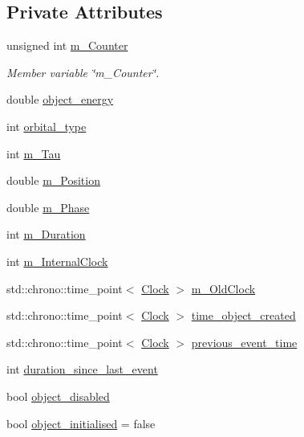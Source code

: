 \subsection*{Private Attributes}
\begin{DoxyCompactItemize}
\item 
unsigned int \mbox{\hyperlink{classOrbital_aa372740124e986fd28903fc0a58b9c76}{m\+\_\+\+Counter}}
\begin{DoxyCompactList}\small\item\em Member variable \char`\"{}m\+\_\+\+Counter\char`\"{}. \end{DoxyCompactList}\item 
double \mbox{\hyperlink{classOrbital_ac625d580da26f03f2222352c92b9e61e}{object\+\_\+energy}}
\item 
int \mbox{\hyperlink{classOrbital_a00b10dd18889b7ab0f3a60de0c6bdcf5}{orbital\+\_\+type}}
\item 
int \mbox{\hyperlink{classOrbital_a39c9d2d348dc7c20970bb16c01c7649e}{m\+\_\+\+Tau}}
\item 
double \mbox{\hyperlink{classOrbital_a16163ba33abccd079bbf5f4bcb9d9054}{m\+\_\+\+Position}}
\item 
double \mbox{\hyperlink{classOrbital_a74299cf4fcffa5078b836c66204439cc}{m\+\_\+\+Phase}}
\item 
int \mbox{\hyperlink{classOrbital_a890367094e4fd52818480127d4cf5083}{m\+\_\+\+Duration}}
\item 
int \mbox{\hyperlink{classOrbital_a8aa88a5fe3fc3bc9c662886ca890360c}{m\+\_\+\+Internal\+Clock}}
\item 
std\+::chrono\+::time\+\_\+point$<$ \mbox{\hyperlink{universe_8h_a0ef8d951d1ca5ab3cfaf7ab4c7a6fd80}{Clock}} $>$ \mbox{\hyperlink{classOrbital_aa3a9163f5de9d49cd8fa11c87502a67b}{m\+\_\+\+Old\+Clock}}
\item 
std\+::chrono\+::time\+\_\+point$<$ \mbox{\hyperlink{universe_8h_a0ef8d951d1ca5ab3cfaf7ab4c7a6fd80}{Clock}} $>$ \mbox{\hyperlink{classOrbital_a0c5c5ea93a03de69e7aa0267d74d8740}{time\+\_\+object\+\_\+created}}
\item 
std\+::chrono\+::time\+\_\+point$<$ \mbox{\hyperlink{universe_8h_a0ef8d951d1ca5ab3cfaf7ab4c7a6fd80}{Clock}} $>$ \mbox{\hyperlink{classOrbital_aa7389103c601bdc29ae97f52d85966a2}{previous\+\_\+event\+\_\+time}}
\item 
int \mbox{\hyperlink{classOrbital_a8deef7437a3b111b12a78e9bc9919604}{duration\+\_\+since\+\_\+last\+\_\+event}}
\item 
bool \mbox{\hyperlink{classOrbital_ae2f3114681ba00fdfeea23d60efea869}{object\+\_\+disabled}}
\item 
bool \mbox{\hyperlink{classOrbital_a41d2c8c2ecad75d258acf7991468a684}{object\+\_\+initialised}} = false
\end{DoxyCompactItemize}

